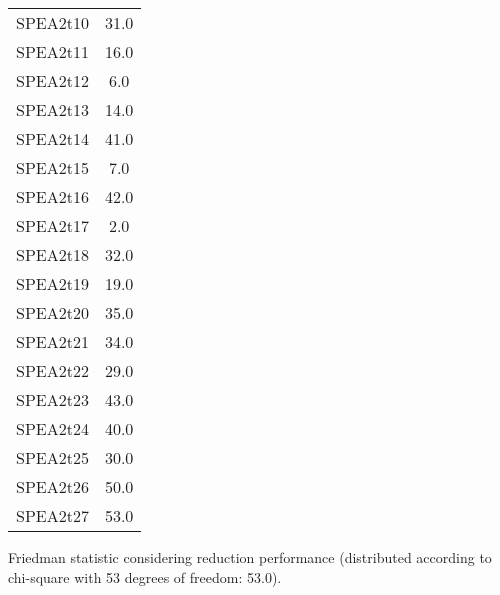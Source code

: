 \documentclass{article}
\begin{document}
\begin{table}[!htp]
\begin{tabular}{c|c}
SPEA2t10&31.0\\
SPEA2t11&16.0\\
SPEA2t12&6.0\\
SPEA2t13&14.0\\
SPEA2t14&41.0\\
SPEA2t15&7.0\\
SPEA2t16&42.0\\
SPEA2t17&2.0\\
SPEA2t18&32.0\\
SPEA2t19&19.0\\
SPEA2t20&35.0\\
SPEA2t21&34.0\\
SPEA2t22&29.0\\
SPEA2t23&43.0\\
SPEA2t24&40.0\\
SPEA2t25&30.0\\
SPEA2t26&50.0\\
SPEA2t27&53.0\\
\end{tabular}
\end{table}


Friedman statistic considering reduction performance (distributed according to chi-square with 53 degrees of freedom: 53.0).
\end{document}
